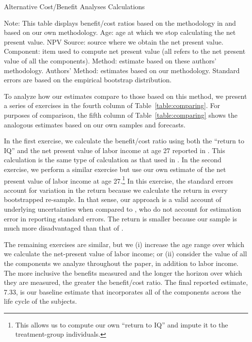 \begin{table}[!htbp]
\begin{threeparttable}
\caption{Alternative Cost/Benefit Analyses Calculations}
\label{table:comparing}
\centering
\footnotesize

\begin{tablenotes}
\footnotesize
\item Note: This table displays benefit/cost ratios based on the methodology in \citet{Kline_Walters_2016_QJE} and based on our own methodology. Age: age at which we stop calculating the net present value. NPV Source: source where we obtain the net present value. Component: item used to compute net present value (all refers to the net present value of all the components). \citet{Kline_Walters_2016_QJE} Method: estimate based on these authors' methodology. Authors' Method: estimates based on our methodology. Standard errors are based on the empirical bootstrap distribution.
\end{tablenotes}
\end{threeparttable}
\end{table}

To analyze how our estimates compare to those based on this method, we present a series of exercises in the fourth column of Table~\ref{table:comparing}. For purposes of comparison, the fifth column of Table~\ref{table:comparing} shows the analogous estimates based on our own samples and forecasts.

In the first exercise, we calculate the benefit/cost ratio using both the ``return to IQ'' and the net present value of labor income at age 27 reported in \citet{Chetty_Friedman_etal_2011_QJoE}. This calculation is the same type of calculation as that used in \citet{Kline_Walters_2016_QJE}. In the second exercise, we perform a similar exercise but use our own estimate of the net present value of labor income at age 27.\footnote{This allows us to compute our own ``return to IQ'' and impute it to the treatment-group individuals.} In this exercise, the standard errors account for variation in the return because we calculate the return in every bootstrapped re-sample. In that sense, our approach is a valid account of underlying uncertainties when compared to \citet{Kline_Walters_2016_QJE}, who do not account for estimation error in reporting standard errors. The return is smaller because our sample is much more disadvantaged than that of \citet{Chetty_Friedman_etal_2011_QJoE}.

The remaining exercises are similar, but we (i) increase the age range over which we calculate the net-present value of labor income; or (ii) consider the value of all the components we analyze throughout the paper, in addition to labor income. The more inclusive the benefits measured and the longer the horizon over which they are measured, the greater the benefit/cost ratio. The final reported estimate, 7.33, is our baseline estimate that incorporates all of the components across the life cycle of the subjects.


